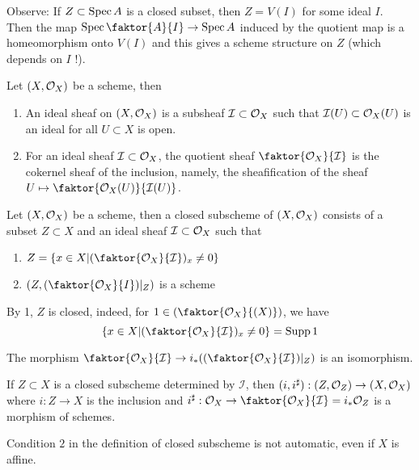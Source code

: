 \documentclass[../main.tex]{subfiles}
\begin{document}
Observe: If $Z \subset \operatorname{Spec} A$ is a closed subset, then $Z = V( I) $ for some ideal $I$.\\
Then the map $\spec \faktor{A}{I}\to \spec A$ induced by the quotient map is a homeomorphism onto $V( I) $ and this gives a scheme structure on $Z$ (which depends on $I$ !).\\
\begin{defn}
	Let $( X,\mathcal{O}_X) $ be a scheme, then
	\begin{enumerate}
	\item An ideal sheaf on $( X,\mathcal{O}_X) $ is a subsheaf $ \mathcal{I} \subset \mathcal{O}_X$ such that $ \mathcal{I}( U) \subset \mathcal{O}_X( U) $ is an ideal for all $U \subset X$ is open.
	\item For an ideal sheaf $ \mathcal{I} \subset \mathcal{O}_X$, the quotient sheaf $ \faktor{\O_X}{ \mathcal{I}}$ is the cokernel sheaf of the inclusion, namely, the sheafification of the sheaf $U \mapsto \faktor{\O_X( U) }{ \mathcal{I}( U) }$.
	\end{enumerate}
	
\end{defn}
\begin{defn}
	Let $( X,\mathcal{O}_X) $ be a scheme, then a closed subscheme of $( X,\mathcal{O}_X) $ consists of a subset $Z \subset X$ and an ideal sheaf $ \mathcal{I} \subset \mathcal{O}_X$ such that
	\begin{enumerate}
		\item $Z= \left\{ x \in X| (  \faktor{\O_X}{ \mathcal{I}})_x \neq 0  \right\} $ 
		\item $ ( Z, ( \faktor{\O_X}{I})|_Z ) $ is a scheme
	\end{enumerate}
\end{defn}
\begin{rmq}
By 1, $Z$ is closed, indeed, for $1 \in ( \faktor{\O_X}{( X) }) $, we have 
\[ 
\left\{ x\in X| ( \faktor{\O_X}{ \mathcal{I}})_x \neq 0  \right\} = \supp 1 
\]

\end{rmq}
\begin{rmq}
The morphism $ \faktor{\O_X}{ \mathcal{I}}\to i_\ast(  ( \faktor{\O_X}{ \mathcal{I}})|_Z ) $ is an isomorphism.\\
\end{rmq}
If $Z \subset X$ is a closed subscheme determined by $ \mathcal{I}$, then $( i,i^{\sharp}) : ( Z,\mathcal{O}_Z) \to ( X,\mathcal{O}_X) $ where $i : Z\to X$ 	is the inclusion and $ i^{\sharp}: \O_X\to \faktor{\O_X}{ \mathcal{I}}= i_\ast\O_Z$ is a morphism of schemes.
\begin{exemple}
Condition $2$ in the definition of closed subscheme is not automatic, even if $X$ is affine.
\end{exemple}
\end{document}
